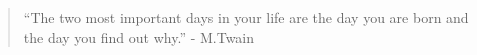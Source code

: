 
\begin{quote}
``The two most important days in your life are the day you are born and the day you find out why.'' - M.Twain
\end{quote}